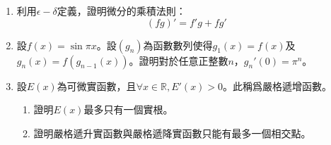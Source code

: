\documentclass[12pt]{article}
\begin{document}
    \begin{enumerate}
        \item 利用$\epsilon-\delta$定義，證明微分的乘積法則：$$(fg)'=f'g+fg'$$
        \item 設$f(x)=\sin{\pi x}$。設$(g_n)$為函數數列使得$g_1(x)=f(x)$及$g_n(x)=f(g_{n-1}(x))$。證明對於任意正整數$n$，$g_n'(0)=\pi^n$。
        \item 設$E(x)$為可微實函數，且$\forall x\in \mathbb{R}, E'(x)>0$。此稱爲嚴格遞增函數。\begin{enumerate}
            \item 證明$E(x)$最多只有一個實根。
            \item 證明嚴格遞升實函數與嚴格遞降實函數只能有最多一個相交點。
        \end{enumerate}
    \end{enumerate}
\end{document}
